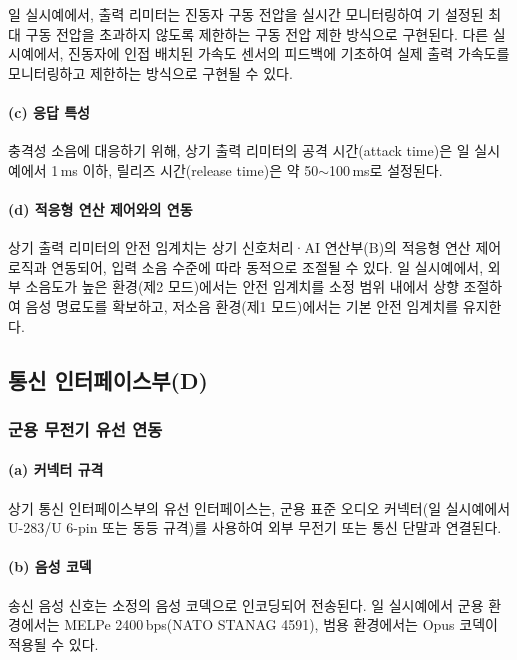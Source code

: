 \documentclass{article}
\begin{document}
일 실시예에서, 출력 리미터는 진동자 구동 전압을 실시간 모니터링하여 기 설정된 최대 구동 전압을 초과하지 않도록 제한하는 구동 전압 제한 방식으로 구현된다. 다른 실시예에서, 진동자에 인접 배치된 가속도 센서의 피드백에 기초하여 실제 출력 가속도를 모니터링하고 제한하는 방식으로 구현될 수 있다.

\paragraph{(c) 응답 특성}

충격성 소음에 대응하기 위해, 상기 출력 리미터의 공격 시간(attack time)은 일 실시예에서 1\,ms 이하, 릴리즈 시간(release time)은 약 50$\sim$100\,ms로 설정된다.

\paragraph{(d) 적응형 연산 제어와의 연동}

상기 출력 리미터의 안전 임계치는 상기 신호처리·AI 연산부(B)의 적응형 연산 제어 로직과 연동되어, 입력 소음 수준에 따라 동적으로 조절될 수 있다. 일 실시예에서, 외부 소음도가 높은 환경(제2 모드)에서는 안전 임계치를 소정 범위 내에서 상향 조절하여 음성 명료도를 확보하고, 저소음 환경(제1 모드)에서는 기본 안전 임계치를 유지한다.

\subsection{통신 인터페이스부(D)}

\subsubsection{군용 무전기 유선 연동}

\paragraph{(a) 커넥터 규격}

상기 통신 인터페이스부의 유선 인터페이스는, 군용 표준 오디오 커넥터(일 실시예에서 U-283/U 6-pin 또는 동등 규격)를 사용하여 외부 무전기 또는 통신 단말과 연결된다.

\paragraph{(b) 음성 코덱}

송신 음성 신호는 소정의 음성 코덱으로 인코딩되어 전송된다. 일 실시예에서 군용 환경에서는 MELPe 2400\,bps(NATO STANAG 4591), 범용 환경에서는 Opus 코덱이 적용될 수 있다.
\end{document}
